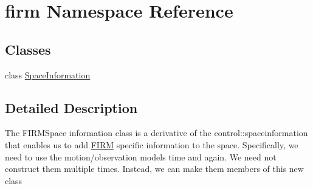 \hypertarget{namespacefirm}{\section{firm \-Namespace \-Reference}
\label{namespacefirm}
}
\subsection*{\-Classes}
\begin{DoxyCompactItemize}
\item 
class \hyperlink{classfirm_1_1_space_information}{\-Space\-Information}
\end{DoxyCompactItemize}


\subsection{\-Detailed \-Description}
\-The \-F\-I\-R\-M\-Space information class is a derivative of the control\-::spaceinformation that enables us to add \hyperlink{class_f_i_r_m}{\-F\-I\-R\-M} specific information to the space. \-Specifically, we need to use the motion/observation models time and again. \-We need not construct them multiple times. \-Instead, we can make them members of this new class 